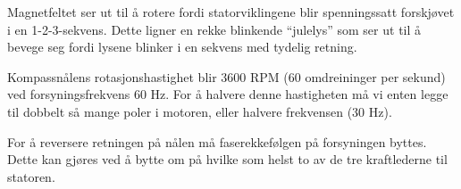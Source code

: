 \vskip 10pt

Magnetfeltet ser ut til å rotere fordi statorviklingene blir spenningssatt forskjøvet i en 1-2-3-sekvens. Dette ligner en rekke blinkende ``julelys'' som ser ut til å bevege seg fordi lysene blinker i en sekvens med tydelig retning.

\vskip 10pt

Kompassnålens rotasjonshastighet blir 3600 RPM (60 omdreininger per sekund) ved forsyningsfrekvens 60 Hz. For å halvere denne hastigheten må vi enten legge til dobbelt så mange poler i motoren, eller halvere frekvensen (30 Hz).

\vskip 10pt

For å reversere retningen på nålen må faserekkefølgen på forsyningen byttes. Dette kan gjøres ved å bytte om på hvilke som helst to av de tre kraftlederne til statoren.











